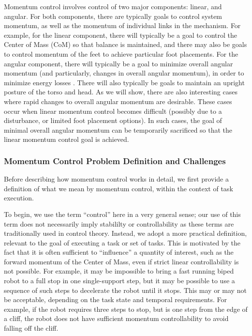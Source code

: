\documentclass{llncs}
\begin{document}
Momentum control involves control of two major components:  linear, and angular.  
For both components, there are typically goals to control system momentum, as well as the momentum of 
individual links in the mechanism.
For example, for the linear component, there will typically be a goal to control the Center of Mass (CoM)
so that balance is maintained, and there may also be goals to control momentum of the feet to achieve
particular foot placements.
For the angular component, there will typically be a goal to minimize overall angular momentum
(and particularly, changes in overall angular momentum), in order to minimize energy losses \cite{PHH04}.
There will also typically be goals to maintain an upright posture of the torso and head.
As we will show, there are also interesting cases where rapid changes to overall angular momentum
are desirable.
These cases occur when linear momentum control becomes difficult (possibly due to a disturbance,
or limited foot placement options).  In such cases, the goal of minimal overall angular momentum
can be temporarily sacrificed so that the linear momentum control goal is achieved.



\subsubsection{Momentum Control Problem Definition and Challenges}

Before describing how momentum control works in detail, we first provide a definition
of what we mean by momentum control, within the context of task execution.

To begin, we use the term ``control'' here in a very general sense;
our use of this term does not necessarily imply stabililty or controllability as these terms are 
traditionally used in control theory.
Instead, we adopt a more practical definition, relevant to the goal of executing a task or set of tasks.
This is motivated by the fact that it is often sufficient to ``influence'' a quantity of interest, such as the 
forward momentum of the Center of Mass, even if strict linear controllability is not possible.
For example, it may be impossible to bring a fast running biped robot to a full stop in one single-support step,
but it may be possible to use a sequence of such steps to decelerate the robot until it stops.
This may or may not be acceptable, depending on the task state and temporal requirements.
For example, if the robot requires three steps to stop, but is one step from the edge of a cliff, the robot
does not have sufficient momentum controllability to avoid falling off the cliff.
\end{document}
